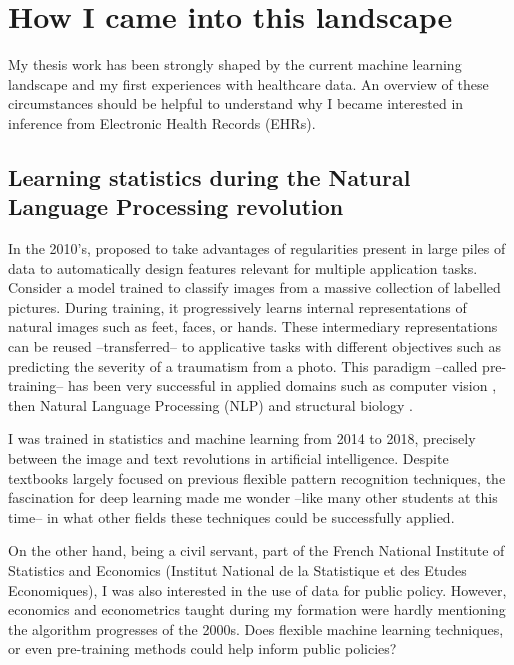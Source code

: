 \documentclass[french,12pt,twoside,a4paper]{book}
\begin{document}
\minitoc
\section{How I came into this landscape}\label{sec:intro:landscape}

My thesis work has been strongly shaped by the current machine learning
landscape and my first experiences with healthcare data. An overview of these
circumstances should be helpful to understand why I became interested in
inference from Electronic Health Records (EHRs).

\subsection{Learning statistics during the Natural Language Processing revolution}

In the 2010's, \cite{halevy2009unreasonable} proposed to take advantages of
regularities present in large piles of data to automatically design features
relevant for multiple application tasks. Consider a model trained to classify
images from a massive collection of labelled pictures. During training, it
progressively learns internal representations of natural images such as feet,
faces, or hands. These intermediary representations can be reused
--transferred-- to applicative tasks with different objectives such as
predicting the severity of a traumatism from a photo. This paradigm --called
pre-training-- has been very successful in applied domains such as computer
vision \citep{krizhevsky2012imagenet}, then Natural Language Processing (NLP)
\citep{devlin2018bert} and structural biology \citep{jumper2021highly}.

I was trained in statistics and machine learning from 2014 to 2018, precisely
between the image and text revolutions in artificial intelligence. Despite
textbooks largely focused on previous flexible pattern recognition techniques,
the fascination for deep learning made me wonder --like many other students at
this time-- in what other fields these techniques could be successfully applied.

On the other hand, being a civil servant, part of the French National Institute of
Statistics and Economics (Institut National de la Statistique et des Etudes Economiques), I
was also interested in the use of data for public policy. However, economics and
econometrics taught during my formation were hardly mentioning the algorithm
progresses of the 2000s. Does flexible machine learning techniques, or even
pre-training methods could help inform public policies?
\end{document}
